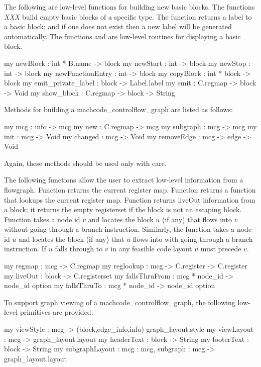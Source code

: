     The following are low-level functions for building new basic blocks.
The functions \emph{XXX} build empty basic blocks of a specific
type.  The function  returns a label to a basic block;
and if one does not exist then a new label will be generated automatically.
The functions  and  are low-level
routines for displaying a basic block.
\begin{SML}
   my newBlock          : int * B.name -> block      
   my newStart          : int -> block              
   my newStop           : int -> block             
   my newFunctionEntry  : int -> block            
   my copyBlock         : int * block -> block   
   my emit_private_label       : block -> Label.label  
   my emit              : C.regmap -> block -> Void
   my show_block        : C.regmap -> block -> String 
\end{SML}

   Methods for building a machcode_controlflow_graph are listed as follows:
\begin{SML}
   my mcg      : info -> mcg    
   my new      : C.regmap -> mcg
   my subgraph : mcg -> mcg     
   my init     : mcg -> Void    
   my changed  : mcg -> Void   
   my removeEdge : mcg -> edge -> Void
\end{SML}
 Again, these methods should be used only with care.

  The following functions allow the user to extract low-level information
from a flowgraph.  Function  returns the current register map.
Function  returns a function that lookups the current register
map.  Function  returns liveOut information from a block;
it returns the empty registerset if the block is not an escaping block.
Function  takes a node id $v$ and locates the
block $u$ (if any) that flows into $v$ without going through a branch
instruction.  Similarly, the function   takes
a node id $u$ and locates the block (if any) that $u$ flows into
with going through a branch instruction.  If $u$ falls through to
$v$ in any feasible code layout $u$ must precede $v$.
\begin{SML}
   my regmap    : mcg -> C.regmap
   my reglookup : mcg -> C.register -> C.register
   my liveOut   : block -> C.registerset
   my fallsThruFrom : mcg * node_id -> node_id option
   my fallsThruTo   : mcg * node_id -> node_id option
\end{SML}

   To support graph viewing of a machcode_controlflow_graph, the following low-level
primitives are provided: 
\begin{SML}
   my viewStyle      : mcg -> (block,edge_info,info) graph_layout.style
   my viewLayout     : mcg -> graph_layout.layout
   my headerText     : block -> String
   my footerText     : block -> String
   my subgraphLayout : { mcg : mcg, subgraph : mcg } -> graph_layout.layout
\end{SML}

